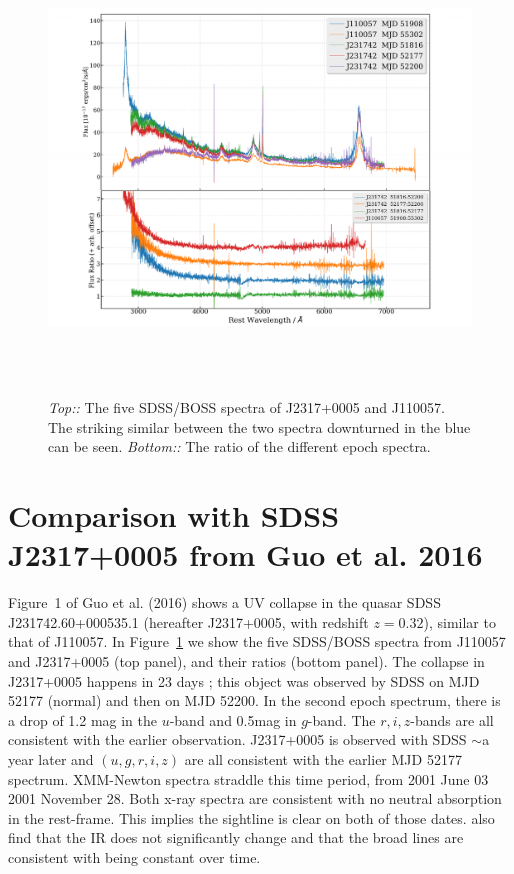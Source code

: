 \documentclass[11pt,a4paper]{article}
\begin{document}
\begin{figure}[h]
  \centering
  \includegraphics[width=16.00cm, height=12.0cm, trim=0.3cm 0.0cm 2.0cm 0.0cm, clip]
  {../plots/spectra/J110057_vs_Guo_both_20171115.pdf}
  \caption[]{ {\it Top::} The five SDSS/BOSS spectra of J2317+0005 and
    J110057.  The striking similar between the two spectra downturned in
    the blue can be seen.  {\it Bottom::} The ratio of the different epoch
    spectra.}
  \label{fig:J110057_vs_Guo}
\end{figure}
\section*{Comparison with SDSS J2317+0005 from Guo et al. 2016}
Figure~1 of Guo et al. (2016) shows a UV collapse in the quasar SDSS
J231742.60+000535.1 (hereafter J2317+0005, with redshift $z=0.32$),
similar to that of J110057. In Figure~\ref{fig:J110057_vs_Guo} we show
the five SDSS/BOSS spectra from J110057 and J2317+0005 (top panel),
and their ratios (bottom panel).  The collapse in J2317+0005 happens
in 23 days \citep[Figure 2 of ][]{Guo2016}; this object was observed
by SDSS on MJD 52177 (normal) and then on MJD 52200. In the second
epoch spectrum, there is a drop of 1.2 mag in the $u$-band and 0.5mag
in $g$-band. The $r,i,z$-bands are all consistent with the earlier
observation. J2317+0005 is observed with SDSS $\sim$a year later and
$(u,g,r,i,z)$ are all consistent with the earlier MJD 52177
spectrum. XMM-Newton spectra straddle this time period, from 2001 June
03 2001 November 28. Both x-ray spectra are consistent with no neutral
absorption in the rest-frame. This implies the sightline is clear on
both of those dates.  \citet{Guo2016} also find that the IR does not
significantly change and that the broad lines are consistent with
being constant over time.
\end{document}
